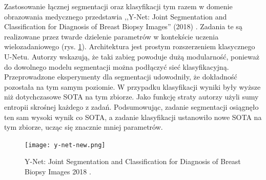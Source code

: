 \vspace{0.5cm}
Zastosowanie łącznej segmentacji oraz klasyfikacji tym razem w domenie obrazowania medycznego przedstawia ,,Y-Net: Joint Segmentation and Classification for Diagnosis of Breast Biopsy Images'' (2018) \cite{mehta2018net}. Zadania te są realizowane przez twarde dzielenie parametrów w kontekście uczenia wielozadaniowego (rys. \ref{fig:y-net}). Architektura jest prostym rozszerzeniem klasycznego U-Netu. Autorzy wskazują, że taki zabieg powoduje dużą modularność, ponieważ do dowolnego modelu segmentacji można podłączyć sieć klasyfikacyjną. Przeprowadzone eksperymenty dla segmentacji udowodniły, że dokładność pozostała na tym samym poziomie. W przypadku klasyfikacji wyniki były wyższe niż dotychczasowe SOTA na tym zbiorze. Jako funkcję straty autorzy użyli sumy entropii skrośnej każdego z zadań. Podsumowując, zadanie segmentacji osiągnęło ten sam wysoki wynik co SOTA, a zadanie klasyfikacji ustanowiło nowe SOTA na tym zbiorze, ucząc się znacznie mniej parametrów.


\begin{figure}[ht!]
    \texttt{[image: y-net-new.png]}
    \caption{Y-Net: Joint Segmentation and Classification for Diagnosis of Breast Biopsy Images 2018 \cite{mehta2018net}.}
    \label{fig:y-net}
\end{figure}

\vspace{0.5cm}

